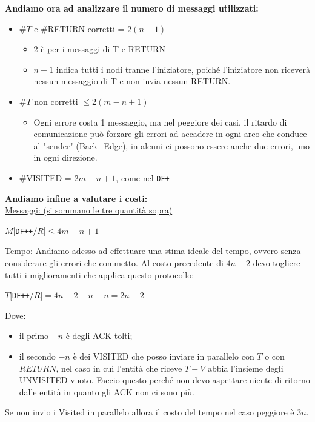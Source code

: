 \textbf{Andiamo ora ad analizzare il numero di messaggi utilizzati:}
\begin{itemize}
    \item \#$T$ e \#RETURN corretti = $2(n-1)$
          \begin{itemize}
              \item 2 è per i messaggi di T e RETURN
              \item $n-1$ indica tutti i nodi tranne l'iniziatore, poiché
                    l'iniziatore non riceverà nessun messaggio di T e non invia
                    nessun RETURN.
          \end{itemize}
    \item \#$T$ non corretti $\leq 2(m-n+1)$
          \begin{itemize}
              \item Ogni errore costa 1 messaggio, ma nel peggiore dei casi, il
                    ritardo di comunicazione può forzare gli errori ad accadere
                    in ogni arco che conduce al "sender" (Back\_Edge), in alcuni
                    ci possono essere anche due errori, uno in ogni direzione.
          \end{itemize}

    \item \#VISITED = $2m - n + 1$, come nel \texttt{DF+}

\end{itemize}

\textbf{Andiamo infine a valutare i costi: }\\
\underline{Messaggi: (si sommano le tre quantità sopra)}
\begin{center}
    $M[$\texttt{DF++}$/R] \leq 4m - n + 1$
\end{center}

\underline{Tempo:}
Andiamo adesso ad effettuare una stima ideale del tempo, ovvero senza
considerare gli errori che commetto. Al costo precedente di $4n-2$ devo togliere
tutti i miglioramenti che applica questo protocollo:
\begin{center}
    $T[$\texttt{DF++}$/R] = 4n - 2 - n - n = 2n - 2$
\end{center}

Dove:
\begin{itemize}
    \item il primo $-n$ è degli ACK tolti;
    \item il secondo $-n$ è dei VISITED che posso inviare in parallelo con $T$ o
          con $RETURN$, nel caso in cui l'entità che riceve $T-V$ abbia l'insieme degli
          UNVISITED vuoto. Faccio questo perché non devo aspettare niente di ritorno
          dalle entità in quanto gli ACK non ci sono più.
\end{itemize}
Se non invio i Visited in parallelo allora il costo del tempo nel caso peggiore
è $3n$.


